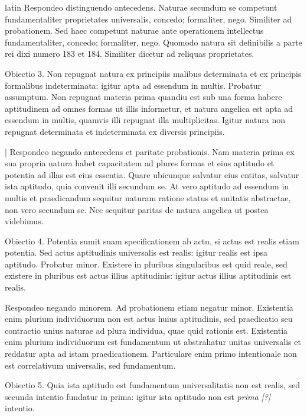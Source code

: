 \begin{otherlanguage*}{latin}
\pstart
  Respondeo distinguendo antecedens. Naturae secundum se competunt fundamentaliter proprietates universalis, concedo; formaliter, nego. Similiter ad probationem. Sed haec competunt naturae ante operationem intellectus fundamentaliter, concedo; formaliter, nego. Quomodo natura sit definibilis a parte rei dixi numero 183 et 184. Similiter dicetur ad reliquas proprietates. 
\pend

\pstart
  Obiectio 3. Non repugnat natura ex principiis malibus determinata et ex principis formalibus indeterminata: igitur apta ad essendum in multis. Probatur assumptum. Non repugnat materia prima quandiu est sub una forma habere aptitudinem ad omnes formas ut illis informetur, et natura angelica est apta ad essendum in multis, quamvis illi repugnat illa multiplicitas. Igitur natura non repugnat determinata et indeterminata ex diversis principiis. 
\pend

\pstart
  \textnormal{|}   Respondeo negando antecedens et paritate probationis. Nam materia prima ex sua propria natura habet capacitatem ad plures formas et eius aptitudo et potentia ad illas est eius essentia. Quare ubicunque salvatur eius entitas, salvatur ista aptitudo, quia convenit illi secundum se. At vero aptitudo ad essendum in multis et praedicandum sequitur naturam ratione status et unitatis abstractae, non vero secundum se. Nec sequitur paritas de natura angelica ut postea videbimus. 
\pend

\pstart
  Obiectio 4. Potentia sumit suam specificationem ab actu, si actus est realis etiam potentia. Sed actus aptitudinis universalis est realis: igitur realis est ipsa aptitudo. Probatur minor. Existere in pluribus singularibus est quid reale, sed existere in pluribus est actus illius aptitudinis: igitur actus illius aptitudinis est realis. 
\pend

\pstart
  Respondeo negando minorem. Ad probationem etiam negatur minor. Existentia enim plurium individuorum non est actus huius aptitudinis, sed praedicatio seu contractio unius naturae ad plura individua, quae quid rationis est. Existentia enim plurium individuorum est fundamentum ut abstrahatur unitas universalis et reddatur apta ad istam praedicationem. Particulare enim primo intentionale non est correlativum universalis, sed fundamentum. 
\pend

\pstart
  Obiectio 5. Quia ista aptitudo est fundamentum universalitatis non est realis, sed secunda intentio fundatur in prima: igitur ista aptitudo non est \emph{prima [?]} intentio. 
\pend


\end{otherlanguage*}
